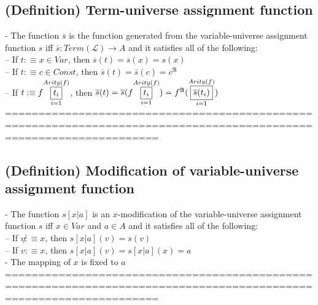 \documentclass{book}
\newcommand{\is}{:\equiv}
\newcommand{\inot}{\not}
\newcommand{\means}[2]{#1^{#2}}
\newcommand{\extend}[1]{\overline{#1}}
\newcommand{\vdc}[3]{\underset{#2}{\overset{#3}{\fbox{$#1$}}}}
\begin{document}
\subsection{(Definition) Term-universe assignment function} %
	- The function $\extend{s}$ is the function generated from the variable-universe assignment function $s$ iff $\extend{s}: Term(\mathcal{L}) \rightarrow A$ and it satisfies all of the following: \\
		-- If $t \is x \in Var$, then $\extend{s}(t) = \extend{s}(x) = s(x)$ \\
		-- If $t \is c \in Const$, then $\extend{s}(t) = \extend{s}(c) = \means{c}{\mathfrak{A}}$ \\
		-- If $t \is f \vdc{t_i}{i=1}{Arity(f)}$, then $\extend{s}(t) = \extend{s}(f \vdc{t_i}{i=1}{Arity(f)}) = \means{f}{\mathfrak{A}}(\vdc{\extend{s}(t_i)}{i=1}{Arity(f)})$ \\
	===================================================================================================================
\subsection{(Definition) Modification of variable-universe assignment function} %
	- The function $s[x|a]$ is an $x$-modification of the variable-universe assignment function $s$ iff $x \in Var$ and $a \in A$ and it satisfies all of the following: \\
		-- If $v \inot \is x$, then $s[x|a](v) = s(v)$ \\
		-- If $v \is x$, then $s[x|a](v) = s[x|a](x) = a$ \\
	- The mapping of $x$ is fixed to $a$ \\
	===================================================================================================================
\end{document}
